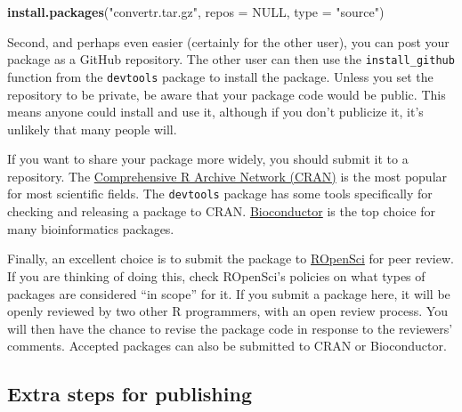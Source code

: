 \documentclass[]{tufte-book}
\newenvironment{Shaded}{}{}
\newcommand{\DataTypeTok}[1]{\textcolor[rgb]{0.56,0.13,0.00}{#1}}
\newcommand{\KeywordTok}[1]{\textcolor[rgb]{0.00,0.44,0.13}{\textbf{#1}}}
\newcommand{\NormalTok}[1]{#1}
\newcommand{\OtherTok}[1]{\textcolor[rgb]{0.00,0.44,0.13}{#1}}
\newcommand{\StringTok}[1]{\textcolor[rgb]{0.25,0.44,0.63}{#1}}
\begin{document}
\begin{Shaded}
\begin{Highlighting}[]
\KeywordTok{install.packages}\NormalTok{(}\StringTok{"convertr.tar.gz"}\NormalTok{, }\DataTypeTok{repos =} \OtherTok{NULL}\NormalTok{, }
    \DataTypeTok{type =} \StringTok{"source"}\NormalTok{)}
\end{Highlighting}
\end{Shaded}

Second, and perhaps even easier (certainly for the other user), you can post your
package as a GitHub repository. The other user can then use the \texttt{install\_github}
function from the \texttt{devtools} package to install the package. Unless you set
the repository to be private, be aware that your package code would be public.
This means anyone could install and use it, although if you don't publicize it,
it's unlikely that many people will.

If you want to share your package more widely, you should submit it to a repository.
The \href{https://cran.rstudio.com/}{Comprehensive R Archive Network (CRAN)} is the most
popular for most scientific fields. The \texttt{devtools} package has some tools specifically
for checking and releasing a package to CRAN. \href{https://www.bioconductor.org/}{Bioconductor}
is the top choice for many bioinformatics packages.

Finally, an excellent choice is to submit the package to
\href{https://ropensci.org/}{ROpenSci} for peer review. If you are thinking of doing this,
check ROpenSci's policies on what types of packages are considered ``in scope'' for it.
If you submit a package here, it will be openly reviewed by two other R programmers,
with an open review process. You will then have the chance to revise the package
code in response to the reviewers' comments. Accepted packages can also be
submitted to CRAN or Bioconductor.

\hypertarget{extra-steps-for-publishing}{%
\subsection{Extra steps for publishing}\label{extra-steps-for-publishing}}
\end{document}
